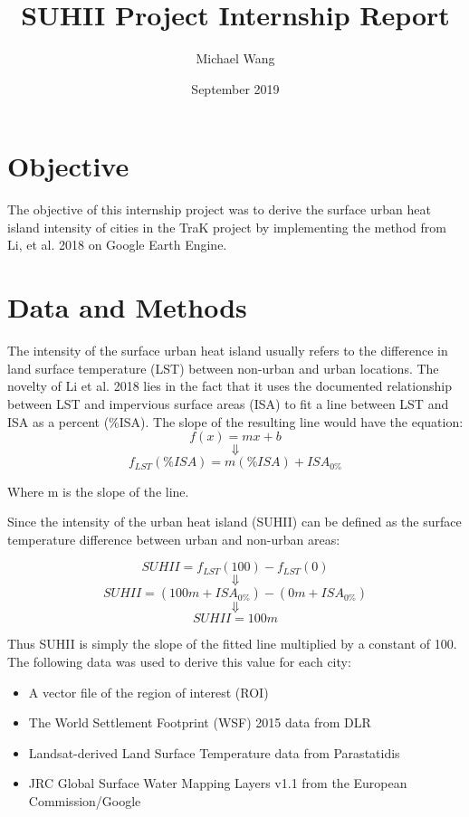 \documentclass{article}
\title{SUHII Project Internship Report}
\author{Michael Wang}
\date{September 2019}
\begin{document}
\maketitle

\section{Objective}

The objective of this internship project was to derive the surface urban heat island intensity of cities in the TraK project by implementing the method from Li, et al. 2018 \cite{li_new_2018} on Google Earth Engine.

\section{Data and Methods}
The intensity of the surface urban heat island usually refers to the difference in land surface temperature (LST) between non-urban and urban locations.
The novelty of Li et al. 2018 \cite{li_new_2018} lies in the fact that it uses the documented relationship between LST and impervious surface areas (ISA) to fit a line between LST and ISA as a percent (\%ISA). The slope of the resulting line would have the equation:
\[f(x) = mx + b\]
\[\Downarrow\]
\[f_{LST}(\%ISA) = m(\%ISA) + ISA_{0\%}\]

Where m is the slope of the line. 

Since the intensity of the urban heat island (SUHII) can be defined as the surface temperature difference between urban and non-urban areas:

\[SUHII = f_{LST}(100) - f_{LST}(0) \]
\[\Downarrow\]
\[SUHII = (100m +  ISA_{0\%}) - (0m +  ISA_{0\%})\]
\[\Downarrow\]
\[SUHII = 100m\]

Thus SUHII is simply the slope of the fitted line multiplied by a constant of 100.
The following data was used to derive this value for each city:
\begin{itemize}
    \item A vector file of the region of interest (ROI)
    \item The World Settlement Footprint (WSF) 2015 data from DLR
    \item Landsat-derived Land Surface Temperature data from Parastatidis \cite{parastatidis_online_2017}
    \item JRC Global Surface Water Mapping Layers v1.1 from the European Commission/Google \cite{pekel_high-resolution_2016}
\end{itemize}
\end{document}
